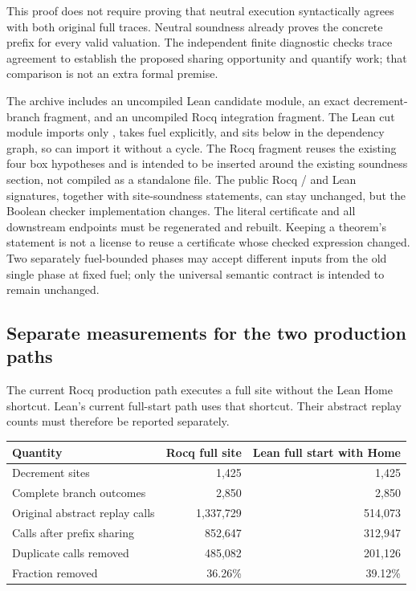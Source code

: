 This proof does not require proving that neutral execution syntactically agrees with both original full traces. Neutral soundness already proves the concrete prefix for every valid valuation. The independent finite diagnostic checks trace agreement to establish the proposed sharing opportunity and quantify work; that comparison is not an extra formal premise.

The archive includes an uncompiled Lean candidate module, an exact decrement-branch fragment, and an uncompiled Rocq integration fragment. The Lean cut module imports only , takes fuel explicitly, and sits below  in the dependency graph, so  can import it without a cycle. The Rocq fragment reuses the existing four box hypotheses and is intended to be inserted around the existing  soundness section, not compiled as a standalone file. The public Rocq / and Lean  signatures, together with site-soundness statements, can stay unchanged, but the Boolean checker implementation changes. The literal  certificate and all downstream endpoints must be regenerated and rebuilt. Keeping a theorem's statement is not a license to reuse a certificate whose checked expression changed. Two separately fuel-bounded phases may accept different inputs from the old single phase at fixed fuel; only the universal semantic contract is intended to remain unchanged.

\subsection{Separate measurements for the two production paths}
The current Rocq production path executes a full site without the Lean Home shortcut. Lean's current full-start path uses that shortcut. Their abstract replay counts must therefore be reported separately.

\begin{center}
\begin{tabular}{@{}lrr@{}}
\toprule
Quantity & Rocq full site & Lean full start with Home \\
\midrule
Decrement sites & 1,425 & 1,425 \\
Complete branch outcomes & 2,850 & 2,850 \\
Original abstract replay calls & 1,337,729 & 514,073 \\
Calls after prefix sharing & 852,647 & 312,947 \\
Duplicate calls removed & 485,082 & 201,126 \\
Fraction removed & 36.26\% & 39.12\% \\
\bottomrule
\end{tabular}
\end{center}

